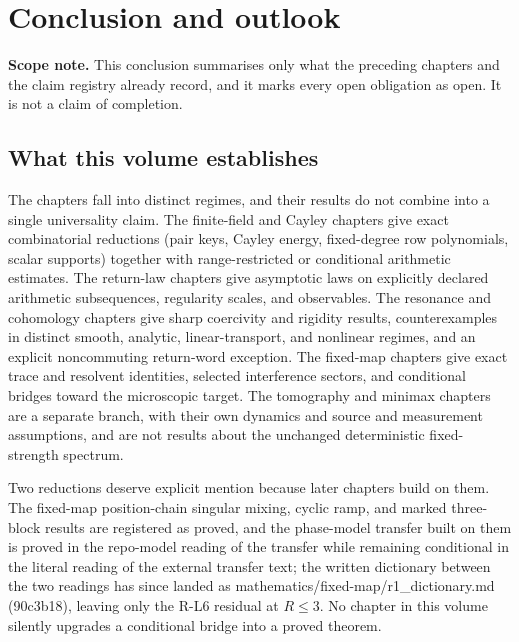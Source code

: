 \section{Conclusion and outlook}
\noindent\textbf{Scope note.} This conclusion
summarises only what the preceding chapters and the claim registry
already record, and it marks every open obligation as open. It is not
a claim of completion.

\subsection{What this volume establishes}
The chapters fall into distinct regimes, and their results do not
combine into a single universality claim. The finite-field and Cayley
chapters give exact combinatorial reductions (pair keys, Cayley energy,
fixed-degree row polynomials, scalar supports) together with
range-restricted or conditional arithmetic estimates. The return-law
chapters give asymptotic laws on explicitly declared arithmetic
subsequences, regularity scales, and observables. The resonance and
cohomology chapters give sharp coercivity and rigidity results,
counterexamples in distinct smooth, analytic, linear-transport, and
nonlinear regimes, and an explicit noncommuting return-word exception.
The fixed-map chapters give exact trace and resolvent identities,
selected interference sectors, and conditional bridges toward the
microscopic target. The tomography and minimax chapters are a separate
branch, with their own dynamics and source and measurement assumptions,
and are not results about the unchanged deterministic fixed-strength
spectrum.

Two reductions deserve explicit mention because later chapters build
on them. The fixed-map position-chain singular mixing, cyclic ramp,
and marked three-block results are registered as proved, and the
phase-model transfer built on them is proved in the repo-model reading
of the transfer while remaining conditional in the literal reading of
the external transfer text; the written dictionary between the two
readings has since landed as mathematics/fixed-map/r1\_dictionary.md
(90c3b18), leaving only the R-L6 residual at \(R \le 3\). No chapter in this
volume silently upgrades a conditional bridge into a proved theorem.

